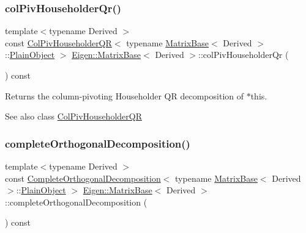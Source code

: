 \subsubsection{\texorpdfstring{colPivHouseholderQr()}{colPivHouseholderQr()}}
{\footnotesize\ttfamily template$<$typename Derived $>$ \\
const \mbox{\hyperlink{class_eigen_1_1_col_piv_householder_q_r}{Col\+Piv\+Householder\+QR}}$<$ typename \mbox{\hyperlink{class_eigen_1_1_matrix_base}{Matrix\+Base}}$<$ Derived $>$\+::\mbox{\hyperlink{class_eigen_1_1_dense_base_aae45af9b5aca5a9caae98fd201f47cc4}{Plain\+Object}} $>$ \mbox{\hyperlink{class_eigen_1_1_matrix_base}{Eigen\+::\+Matrix\+Base}}$<$ Derived $>$\+::col\+Piv\+Householder\+Qr (\begin{DoxyParamCaption}{ }\end{DoxyParamCaption}) const\hspace{0.3cm}{\ttfamily [inline]}}

\begin{DoxyReturn}{Returns}
the column-\/pivoting Householder QR decomposition of {\ttfamily $\ast$this}.
\end{DoxyReturn}
\begin{DoxySeeAlso}{See also}
class \mbox{\hyperlink{class_eigen_1_1_col_piv_householder_q_r}{Col\+Piv\+Householder\+QR}} 
\end{DoxySeeAlso}
\mbox{\label{class_eigen_1_1_matrix_base_ae90b6846f05bd30b8d52b66e427e3e09}} 
\subsubsection{\texorpdfstring{completeOrthogonalDecomposition()}{completeOrthogonalDecomposition()}}
{\footnotesize\ttfamily template$<$typename Derived $>$ \\
const \mbox{\hyperlink{class_eigen_1_1_complete_orthogonal_decomposition}{Complete\+Orthogonal\+Decomposition}}$<$ typename \mbox{\hyperlink{class_eigen_1_1_matrix_base}{Matrix\+Base}}$<$ Derived $>$\+::\mbox{\hyperlink{class_eigen_1_1_dense_base_aae45af9b5aca5a9caae98fd201f47cc4}{Plain\+Object}} $>$ \mbox{\hyperlink{class_eigen_1_1_matrix_base}{Eigen\+::\+Matrix\+Base}}$<$ Derived $>$\+::complete\+Orthogonal\+Decomposition (\begin{DoxyParamCaption}{ }\end{DoxyParamCaption}) const\hspace{0.3cm}{\ttfamily [inline]}}


